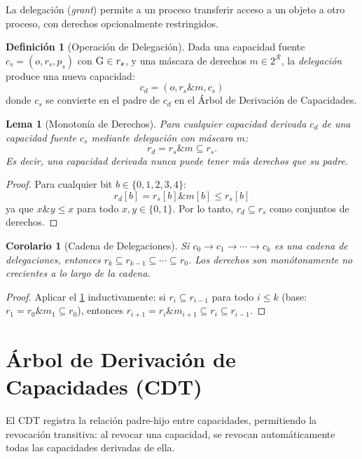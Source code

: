 \documentclass[11pt,twoside,openright]{book}
\theoremstyle{definition}
\newtheorem{definition}{Definición}[chapter]
\theoremstyle{plain}
\newtheorem{lemma}[theorem]{Lema}
\newtheorem{corollary}[theorem]{Corolario}
\theoremstyle{remark}
\newcommand{\rights}{\mathcal{R}}
\newcommand{\bitand}{\mathbin{\&}}
\begin{document}
La delegación (\emph{grant}) permite a un proceso transferir acceso a un objeto a otro
proceso, con derechos opcionalmente restringidos.

\begin{definition}[Operación de Delegación]
\label{def:grant}
Dada una capacidad fuente $c_s = (o, r_s, p_s)$ con $\textsc{G} \in r_s$,
y una máscara de derechos $m \in 2^{\rights}$, la \emph{delegación} produce una nueva
capacidad:
\[
    c_d = (o, r_s \bitand m, c_s)
\]
donde $c_s$ se convierte en el padre de $c_d$ en el Árbol de Derivación de Capacidades.
\end{definition}

\begin{lemma}[Monotonía de Derechos]
\label{lem:rights-monotone}
Para cualquier capacidad derivada $c_d$ de una capacidad fuente $c_s$ mediante delegación
con máscara $m$:
\[
    r_d = r_s \bitand m \subseteq r_s.
\]
Es decir, una capacidad derivada nunca puede tener más derechos que su padre.
\end{lemma}

\begin{proof}
Para cualquier bit $b \in \{0, 1, 2, 3, 4\}$:
\[
    r_d[b] = r_s[b] \bitand m[b] \leq r_s[b]
\]
ya que $x \bitand y \leq x$ para todo $x, y \in \{0, 1\}$. Por lo tanto,
$r_d \subseteq r_s$ como conjuntos de derechos.
\end{proof}

\begin{corollary}[Cadena de Delegaciones]
\label{cor:delegation-chain}
Si $c_0 \to c_1 \to \cdots \to c_k$ es una cadena de delegaciones, entonces
$r_k \subseteq r_{k-1} \subseteq \cdots \subseteq r_0$. Los derechos son
monótonamente no crecientes a lo largo de la cadena.
\end{corollary}

\begin{proof}
Aplicar el \cref{lem:rights-monotone} inductivamente: si $r_i \subseteq r_{i-1}$ para
todo $i \leq k$ (base: $r_1 = r_0 \bitand m_1 \subseteq r_0$), entonces
$r_{i+1} = r_i \bitand m_{i+1} \subseteq r_i \subseteq r_{i-1}$.
\end{proof}

\section{Árbol de Derivación de Capacidades (CDT)}
\label{sec:cdt}

El CDT registra la relación padre-hijo entre capacidades, permitiendo la revocación
transitiva: al revocar una capacidad, se revocan automáticamente todas las capacidades
derivadas de ella.
\end{document}

